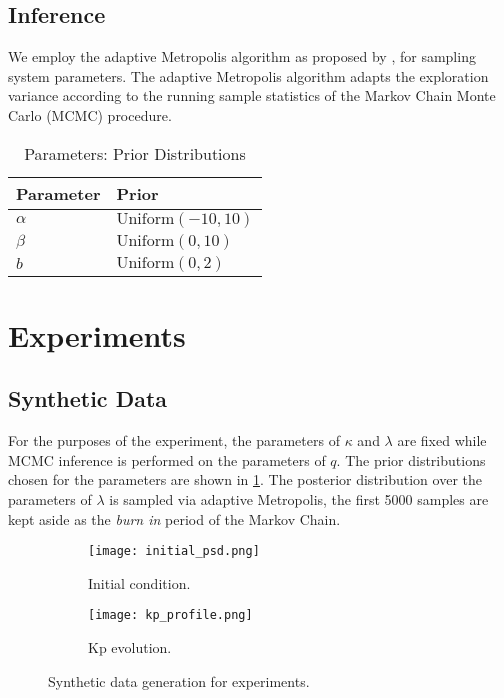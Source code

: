 \subsection{Inference}

We employ the adaptive Metropolis algorithm as proposed by \citet{haario2001}, for sampling
system parameters. The adaptive Metropolis algorithm adapts the exploration variance according to 
the running sample statistics of the Markov Chain Monte Carlo (MCMC) procedure.

\begin{table}[t]
  \caption{Parameters: Prior Distributions}
  \label{tab:prior}
  \centering
  \begin{tabular}{ll}
    \hline
    \textbf{Parameter} & \textbf{Prior}\\
    \hline
    $\alpha$ & $\text{Uniform}(-10, 10)$ \\
    $\beta$  & $\text{Uniform}(0, 10)$ \\ 
    $b$ & $\text{Uniform}(0, 2)$ \\
    \hline
  \end{tabular}
\end{table}


\section{Experiments}\label{sec:exp}


\subsection{Synthetic Data}

For the purposes of the experiment, the parameters of $\kappa$ and $\lambda$ are fixed while MCMC 
inference is performed on the parameters of $q$. The prior distributions chosen for the parameters 
are shown in \cref{tab:prior}. The posterior distribution over the parameters of $\lambda$ is 
sampled via adaptive Metropolis, the first 5000 samples are kept aside as the \emph{burn in} period
of the Markov Chain.


\begin{figure*}[!htb]
  \centering
  \begin{subfigure}[b]{0.75\textwidth}
    \centering
    \texttt{[image: initial\_psd.png]}
    \caption{ 
      Initial condition.
    }
    \label{fig:initialpsd}
  \end{subfigure}
  \hfill
  \begin{subfigure}[b]{0.75\textwidth}
    \centering
    \texttt{[image: kp\_profile.png]}
    \caption{
      Kp evolution.
    }
    \label{fig:kpProfile}
  \end{subfigure}
  \caption{Synthetic data generation for experiments.}
\end{figure*}

